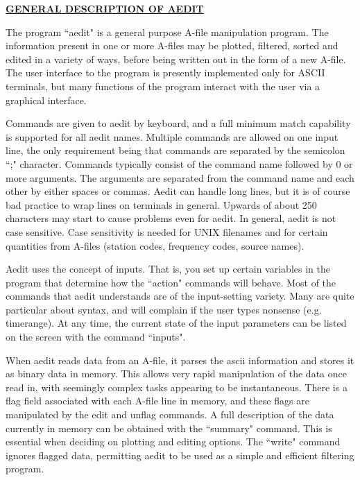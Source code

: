 \begin{center}
\begin{center}
\Large\bf
\underline{GENERAL DESCRIPTION OF AEDIT}
\end{center}

The program ``aedit" is a general purpose A-file manipulation
program.  The information present in one or more A-files may
be plotted, filtered, sorted and edited in a variety of ways, 
before being written out in the form of a new A-file.  The user
interface to the program is presently implemented only for
ASCII terminals, but many functions of the program interact
with the user via a graphical interface.

Commands are given to aedit by keyboard, and a full minimum
match capability is supported for all aedit names.  Multiple
commands are allowed on one input line, the only requirement
being that commands are separated by the semicolon ``;" 
character.  Commands typically consist of the command name
followed by 0 or more arguments.  The arguments are separated
from the command name and each other by either spaces or
commas.  Aedit can handle long lines, but it is of course bad
practice to wrap lines on terminals in general.  Upwards of
about 250 characters may start to cause problems even for aedit.
In general, aedit is not case sensitive.  Case sensitivity
is needed for UNIX filenames and for certain quantities from 
A-files (station codes, frequency codes, source names).

Aedit uses the concept of inputs.  That is, you set up
certain variables in the program that determine how the ``action"
commands will behave.  Most of the commands that aedit
understands are of the input-setting variety.  Many are quite
particular about syntax, and will complain if the user types
nonsense (e.g. timerange).  At any time, the current state of
the input parameters can be listed on the screen with the
command ``inputs".

When aedit reads data from an A-file, it parses the ascii
information and stores it as binary data in memory.  This allows
very rapid manipulation of the data once read in, with
seemingly complex tasks appearing to be instantaneous.  There
is a flag field associated with each A-file line in memory,
and these flags are manipulated by the edit and unflag commands.
A full description of the data currently in memory can be
obtained with the ``summary" command.  This is essential when
deciding on plotting and editing options.  The ``write" command
ignores flagged data, permitting aedit to be used as a simple
and efficient filtering program.


\end{center}
